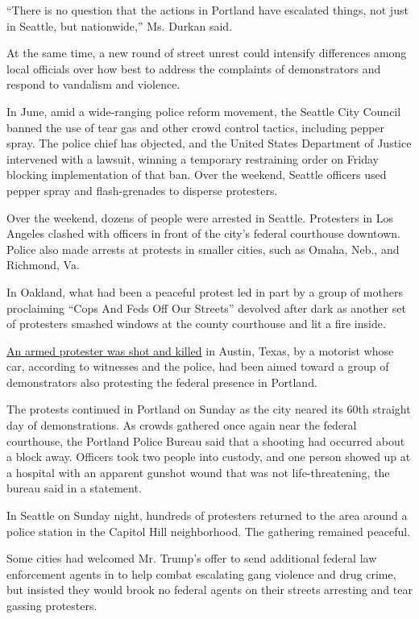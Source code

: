 ``There is no question that the actions in Portland have escalated
things, not just in Seattle, but nationwide,'' Ms. Durkan said.

At the same time, a new round of street unrest could intensify
differences among local officials over how best to address the
complaints of demonstrators and respond to vandalism and violence.

In June, amid a wide-ranging police reform movement, the Seattle City
Council banned the use of tear gas and other crowd control tactics,
including pepper spray. The police chief has objected, and the United
States Department of Justice intervened with a lawsuit, winning a
temporary restraining order on Friday blocking implementation of that
ban. Over the weekend, Seattle officers used pepper spray and
flash-grenades to disperse protesters.

Over the weekend, dozens of people were arrested in Seattle. Protesters
in Los Angeles clashed with officers in front of the city's federal
courthouse downtown. Police also made arrests at protests in smaller
cities, such as Omaha, Neb., and Richmond, Va.

In Oakland, what had been a peaceful protest led in part by a group of
mothers proclaiming ``Cops And Feds Off Our Streets'' devolved after
dark as another set of protesters smashed windows at the county
courthouse and lit a fire inside.

\href{https://www.nytimes.com/2020/07/26/us/austin-shooting-texas-protests.html}{An
armed protester was shot and killed} in Austin, Texas, by a motorist
whose car, according to witnesses and the police, had been aimed toward
a group of demonstrators also protesting the federal presence in
Portland.

The protests continued in Portland on Sunday as the city neared its 60th
straight day of demonstrations. As crowds gathered once again near the
federal courthouse, the Portland Police Bureau said that a shooting had
occurred about a block away. Officers took two people into custody, and
one person showed up at a hospital with an apparent gunshot wound that
was not life-threatening, the bureau said in a statement.

In Seattle on Sunday night, hundreds of protesters returned to the area
around a police station in the Capitol Hill neighborhood. The gathering
remained peaceful.

Some cities had welcomed Mr. Trump's offer to send additional federal
law enforcement agents in to help combat escalating gang violence and
drug crime, but insisted they would brook no federal agents on their
streets arresting and tear gassing protesters.

